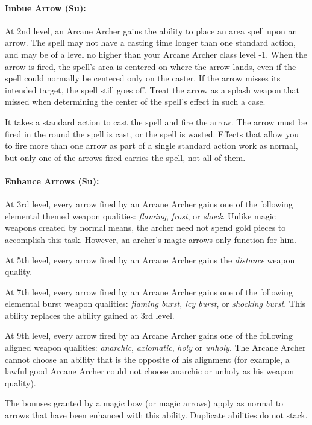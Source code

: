 \paragraph{Imbue Arrow (Su):}
At 2nd level, an Arcane Archer gains the ability to place an area spell upon an arrow.
The spell may not have a casting time longer than one standard action, and may be of a level no higher than your Arcane Archer class level -1.
When the arrow is fired, the spell's area is centered on where the arrow lands, even if the spell could normally be centered only on the caster. If the arrow misses its intended target, the spell still goes off. Treat the arrow as a splash weapon that missed when determining the center of the spell's effect in such a case.

It takes a standard action to cast the spell and fire the arrow. 
The arrow must be fired in the round the spell is cast, or the spell is wasted.
Effects that allow you to fire more than one arrow as part of a single standard action work as normal, but only one of the arrows fired carries the spell, not all of them.
\paragraph{Enhance Arrows (Su):}
At 3rd level, every arrow fired by an Arcane Archer gains one of the following elemental themed weapon qualities: \emph{flaming}, \emph{frost}, or \emph{shock}. Unlike magic weapons created by normal means, the archer need not spend gold pieces to accomplish this task. However, an archer's magic arrows only function for him.

At 5th level, every arrow fired by an Arcane Archer gains the \emph{distance} weapon quality.

At 7th level, every arrow fired by an Arcane Archer gains one of the following elemental burst weapon qualities: \emph{flaming burst}, \emph{icy burst}, or \emph{shocking burst}. This ability replaces the ability gained at 3rd level.

At 9th level, every arrow fired by an Arcane Archer gains one of the following aligned weapon qualities: \emph{anarchic}, \emph{axiomatic}, \emph{holy} or \emph{unholy}. The Arcane Archer cannot choose an ability that is the opposite of his alignment (for example, a lawful good Arcane Archer could not choose anarchic or unholy as his weapon quality).

The bonuses granted by a magic bow (or magic arrows) apply as normal to arrows that have been enhanced with this ability. Duplicate abilities do not stack.





